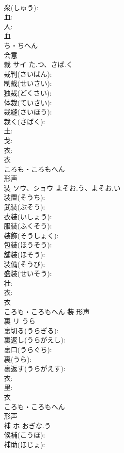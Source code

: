 \documentclass[8pt]{extreport}
\begin{document}
\begin{CJK}{UTF8}{min}
\\	衆(しゅう): 
\\	血: 
\\	人: 
\\	血	
\\	ち・ちへん	
\\	会意 
\\	裁	サイ	た.つ、さば.く		
\\	裁判(さいばん): 
\\	制裁(せいさい): 
\\	独裁(どくさい): 
\\	体裁(ていさい): 
\\	裁縫(さいほう): 
\\	裁く(さばく): 
\\	土: 
\\	戈: 
\\	衣: 
\\	衣	
\\	ころも・ころもへん	
\\	形声 
\\	装	ソウ、ショウ	よそお.う、よそお.い		
\\	装置(そうち): 
\\	武装(ぶそう): 
\\	衣装(いしょう): 
\\	服装(ふくそう): 
\\	装飾(そうしょく): 
\\	包装(ほうそう): 
\\	舗装(ほそう): 
\\	装備(そうび): 
\\	盛装(せいそう): 
\\	壮: 
\\	衣: 
\\	衣	
\\	ころも・ころもへん	裝	形声 
\\	裏	リ	うら		
\\	裏切る(うらぎる): 
\\	裏返し(うらがえし): 
\\	裏口(うらぐち): 
\\	裏(うら): 
\\	裏返す(うらがえす): 
\\	衣: 
\\	里: 
\\	衣	
\\	ころも・ころもへん	
\\	形声 
\\	補	ホ	おぎな.う		
\\	候補(こうほ): 
\\	補助(ほじょ): 

\end{CJK}
\end{document}
